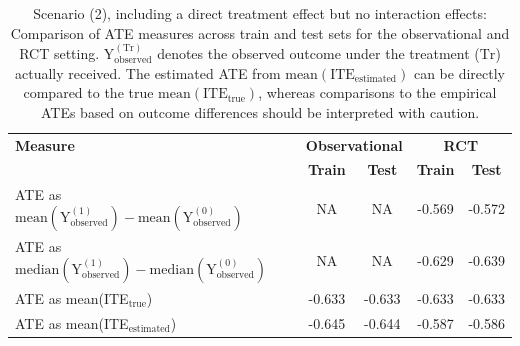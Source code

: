 \begin{table}[htbp]
\centering
\small
\caption{Scenario (2), including a direct treatment effect but no interaction effects: Comparison of ATE measures across train and test sets for the observational and RCT setting. $\text{Y}_\text{observed}^{(\text{Tr})}$ denotes the observed outcome under the treatment ($\text{Tr}$) actually received. The estimated ATE from $\text{mean}(\text{ITE}_\text{estimated})$ can be directly compared to the true $\text{mean}(\text{ITE}_\text{true})$, whereas comparisons to the empirical ATEs based on outcome differences should be interpreted with caution.}
\label{tab:scenario2_ate_comparison}
\begin{tabular}{l c c c c}
\toprule
\textbf{Measure} & \multicolumn{2}{c}{\textbf{Observational}} & \multicolumn{2}{c}{\textbf{RCT}} \\
\cmidrule(lr){2-3} \cmidrule(lr){4-5}
 & \textbf{Train} & \textbf{Test} & \textbf{Train} & \textbf{Test} \\
\midrule
ATE as $\text{mean}(\text{Y}_\text{observed}^{(1)}) - \text{mean}(\text{Y}_\text{observed}^{(0)})$ 
& NA & NA 
& -0.569 
& -0.572 \\

ATE as $\text{median}(\text{Y}_\text{observed}^{(1)}) - \text{median}(\text{Y}_\text{observed}^{(0)})$  
& NA & NA 
& -0.629 
& -0.639 \\

ATE as mean(ITE$_\text{true}$)  
& -0.633 
& -0.633 
& -0.633 
& -0.633 \\

ATE as mean(ITE$_\text{estimated}$) 
& -0.645 
& -0.644 
& -0.587 
& -0.586 \\
\bottomrule
\end{tabular}
\end{table}

